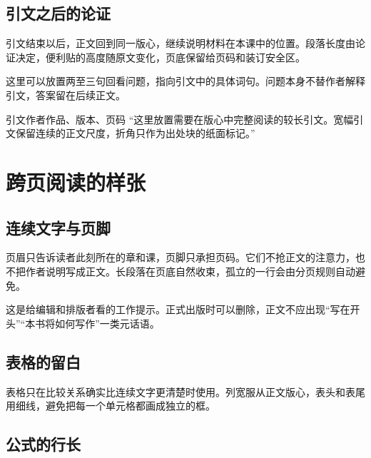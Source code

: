 \subsection{引文之后的论证}

引文结束以后，正文回到同一版心，继续说明材料在本课中的位置。段落长度由论证决定，便利贴的高度随原文变化，页底保留给页码和装订安全区。

\begin{readingbox}[材料回看]
这里可以放置两至三句回看问题，指向引文中的具体词句。问题本身不替作者解释引文，答案留在后续正文。
\end{readingbox}

\begin{fullquote}{引文作者}{作品、版本、页码}
“这里放置需要在版心中完整阅读的较长引文。宽幅引文保留连续的正文尺度，折角只作为出处块的纸面标记。”
\end{fullquote}

\section{跨页阅读的样张}

\subsection{连续文字与页脚}

页眉只告诉读者此刻所在的章和课，页脚只承担页码。它们不抢正文的注意力，也不把作者说明写成正文。长段落在页底自然收束，孤立的一行会由分页规则自动避免。

\begin{noteBox}[制作提示]
这是给编辑和排版者看的工作提示。正式出版时可以删除，正文不应出现“写在开头”“本书将如何写作”一类元话语。
\end{noteBox}


\subsection{表格的留白}

表格只在比较关系确实比连续文字更清楚时使用。列宽服从正文版心，表头和表尾用细线，避免把每一个单元格都画成独立的框。

\subsection{公式的行长}


